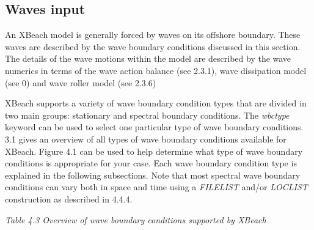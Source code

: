 \documentclass{article}
\begin{document}
\subsection{ Waves input}

\noindent An XBeach model is generally forced by waves on its offshore boundary. These waves are described by the wave boundary conditions discussed in this section. The details of the wave motions within the model are described by the wave numerics in terms of the wave action balance (see 2.3.1), wave dissipation model (see 0) and wave roller model (see 2.3.6)

\noindent XBeach supports a variety of wave boundary condition types that are divided in two main groups: stationary and spectral boundary conditions. The \textit{wbctype} keyword can be used to select one particular type of wave boundary conditions. 3.1 gives an overview of all types of wave boundary conditions available for XBeach. Figure 4.1 can be used to help determine what type of wave boundary conditions is appropriate for your case. Each wave boundary condition type is explained in the following subsections. Note that most spectral wave boundary conditions can vary both in space and time using a \textit{FILELIST} and/or \textit{LOCLIST} construction as described in 4.4.4.

\noindent \textit{Table 4.3 Overview of wave boundary conditions supported by XBeach}
\end{document}
